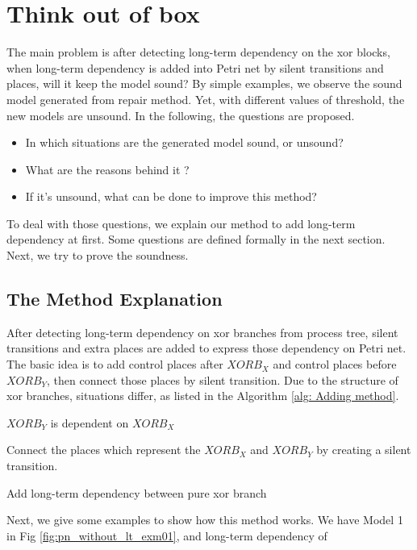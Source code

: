 \documentclass[]{article}
\begin{document}
\section{Think out of box}
The main problem is after detecting long-term dependency on the xor blocks, when long-term dependency is added into Petri net by silent transitions and places, will it keep the model sound? By simple examples, we observe the sound model generated from repair method. Yet, with different values of threshold, the new models are unsound. In the following, the questions are proposed. 
\begin{itemize}
	\item In which situations are the generated model sound, or unsound?
	\item What are the reasons behind it ?
	\item If it's unsound, what can be done to improve this method?
\end{itemize}
To deal with those questions, we explain our method to add long-term dependency at first. Some questions are defined formally in the next section. Next, we try to prove the soundness. 
\subsection{The Method Explanation}
After detecting long-term dependency on xor branches from process tree, silent transitions and extra places are added to express those dependency on Petri net. The basic idea is to add control places after $XORB_X$ and control places before $XORB_Y$, then connect those places by silent transition. Due to the structure of xor branches, situations differ, as listed in the Algorithm \ref{alg: Adding method}.  
\begin{algorithm}[!ht]
	\SetAlgoLined
	$XORB_Y$ is dependent on $XORB_X$\;
	
	Connect the places which represent the $XORB_X$ and $XORB_Y$ by creating a silent transition.
	\caption{Add long-term dependency between pure xor branch}
	\label{alg: Adding method}
\end{algorithm}
Next, we give some examples to show how this method works. We have Model 1 in Fig \ref{fig:pn_without_lt_exm01}, and long-term dependency of 
\end{document}
